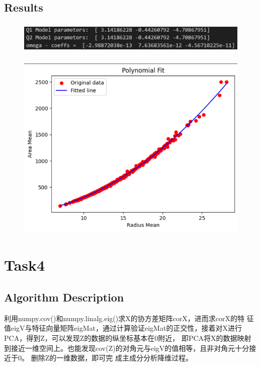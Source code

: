\documentclass{ctexart}
\begin{document}
\subsection{Results}
\begin{figure}[H]
	\centering 
	\includegraphics[height=1.5cm,width=14cm]{6.png}
	\end{figure}
	\begin{figure}[H]
		\centering 
		\includegraphics[height=9cm,width=14cm]{7.png}
		\end{figure}
    \section{Task4}

	\subsection{Algorithm Description}
	利用numpy.cov()和numpy.linalg.eig()求X的协方差矩阵corX，进而求corX的特
征值eigV与特征向量矩阵eigMat，通过计算验证eigMat的正交性，接着对X进行PCA，得到Z，可以发现Z的数据的纵坐标基本在0附近，
即PCA将X的数据映射到接近一维空间上。也能发现cov(Z)的对角元与eigV的值相等，且非对角元十分接近于0。
删除Z的一维数据，即可完
成主成分分析降维过程。
\end{document}
